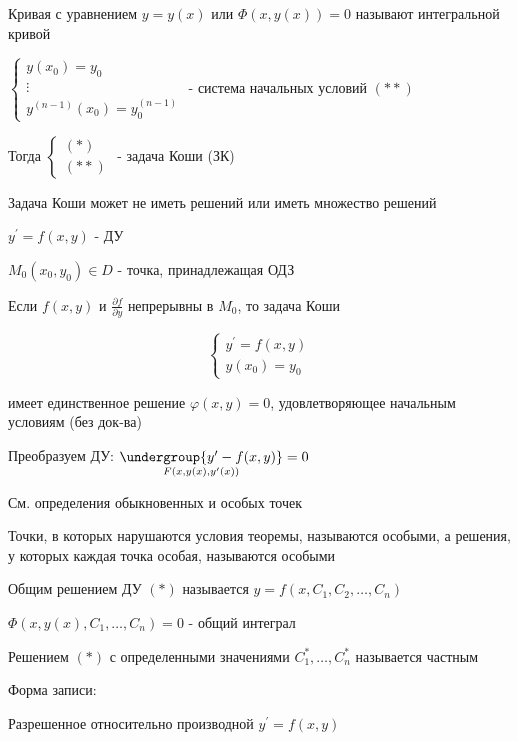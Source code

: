 \documentclass[12pt]{article}
\begin{document}
     Кривая с уравнением $y = y(x)$ или $\Phi(x, y(x)) = 0$ называют интегральной кривой

    \hypertarget{problemCauchy}{}

     $\begin{cases}y(x_0) = y_0 \\ \vdots \\ y^{(n - 1)}(x_0) = y_0^{(n - 1)}\end{cases}$ - система начальных условий $(**)$

    Тогда $\begin{cases}(*) \\ (**)\end{cases}$ - задача Коши (ЗК)

    \Notas Задача Коши может не иметь решений или иметь множество решений

    \begin{MyTheorem}
        \Ths $y^\prime = f(x, y)$ - ДУ

        $M_0(x_0, y_0) \in D$ - точка, принадлежащая ОДЗ

        Если $f(x, y)$ и $\frac{\partial f}{\partial y}$ непрерывны в $M_0$, то задача Коши

        \[\begin{cases}y^\prime = f(x, y) \\ y(x_0) = y_0\end{cases}\]

        имеет единственное решение $\varphi(x, y) = 0$, удовлетворяющее начальным условиям (без док-ва)
    \end{MyTheorem}

    \Nota Преобразуем ДУ: $\underset{F(x, y(x), y^\prime(x))}{\undergroup{y^\prime - f(x, y)}} = 0$

    См. определения обыкновенных и особых точек

     Точки, в которых нарушаются условия теоремы, называются особыми, а решения, у которых каждая точка особая,
    называются особыми

     Общим решением ДУ $(*)$ называется $y = f(x, C_1, C_2, \dots, C_n)$

    \Notas $\Phi(x, y(x), C_1, \dots, C_n) = 0$ - общий интеграл

     Решением $(*)$ с определенными значениями $C_1^*, \dots, C_n^*$ называется частным

    \Nota Форма записи:

    Разрешенное относительно производной $y^\prime = f(x, y)$
\end{document}
